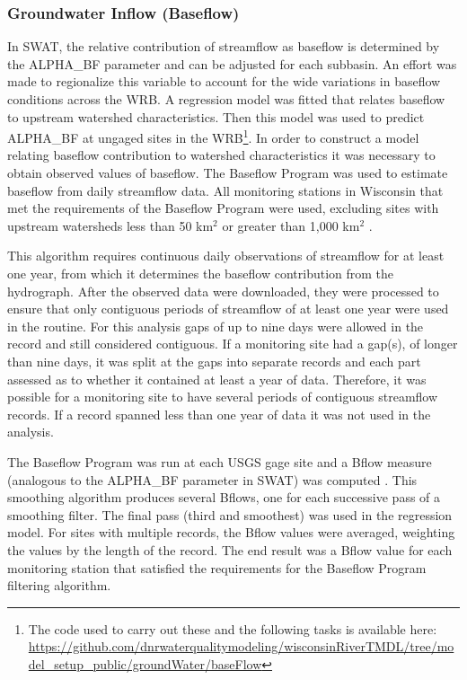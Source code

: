 \subsubsection{Groundwater Inflow (Baseflow)}\label{sec:baseflow}
	In SWAT, the relative contribution of streamflow as baseflow is determined by the ALPHA\_BF parameter and can be adjusted for each subbasin. An effort was made to regionalize this variable to account for the wide variations in baseflow conditions across the WRB. A regression model was fitted that relates baseflow to upstream watershed characteristics. Then this model was used to predict ALPHA\_BF at ungaged sites in the WRB\footnote{The code used to carry out these and the following tasks is available here: \url{https://github.com/dnrwaterqualitymodeling/wisconsinRiverTMDL/tree/model_setup_public/groundWater/baseFlow}}.
	In order to construct a model relating baseflow contribution to watershed characteristics it was necessary to obtain observed values of baseflow. The Baseflow Program \citep{arnold_automated_1995} was used to estimate baseflow from daily streamflow data. All monitoring stations in Wisconsin  that met the requirements of the Baseflow Program were used, excluding sites with upstream watersheds less than 50 km$^2$ or greater than 1,000 km$^2$ \citep{arnold_regional_2000}.

	This algorithm requires continuous daily observations of streamflow for at least one year, from which it determines the baseflow contribution from the hydrograph.	After the observed data were downloaded, they were processed to ensure that only contiguous periods of streamflow of at least one year were used in the routine. For this analysis gaps of up to nine days were allowed in the record and still considered contiguous. If a monitoring site had a gap(s), of longer than nine days, it was split at the gaps into separate records and each part assessed as to whether it contained at least a year of data. Therefore, it was possible for a monitoring site to have several periods of contiguous streamflow records. If a record spanned less than one year of data it was not used in the analysis.
	
	The Baseflow Program was run at each USGS gage site and a Bflow measure (analogous to the ALPHA\_BF parameter in SWAT) was computed \citep{arnold_automated_1995}. This smoothing algorithm produces several Bflows, one for each successive pass of a smoothing filter. The final pass (third and smoothest) was used in the regression model. For sites with multiple records, the Bflow values were averaged, weighting the values by the length of the record. The end result was a Bflow value for each monitoring station that satisfied the requirements for the Baseflow Program filtering algorithm.  

